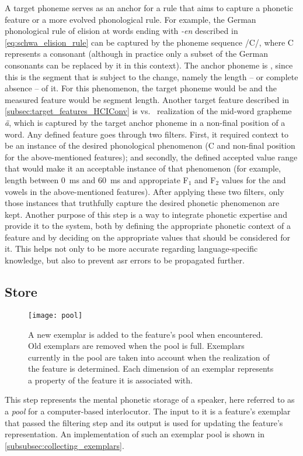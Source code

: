 A target phoneme serves as an anchor for a rule that aims to capture a phonetic feature or a more evolved phonological rule.
For example, the German phonological rule of \textipa{[@]} elision at words ending with \emph{-en} described in \cref{eq:schwa_elision_rule} can be captured by the phoneme sequence /C/, where C represents a consonant (although in practice only a subset of the German consonants can be replaced by it in this context).
The anchor phoneme is \textipa{[@]}, since this is the segment that is subject to the change, namely the length -- or complete absence -- of it.
For this phenomenon, the target phoneme would be  and the measured feature would be segment length.
Another target feature described in \cref{subsec:target_features_HCIConv} is \textipa{[e:]} vs.\ \textipa{[E:]} realization of the mid-word grapheme \emph{ä}, which is captured by the target anchor phoneme \textipa{[E]} in a non-final position of a word.
Any defined feature goes through two filters. First, it required context to be an instance of the desired phonological phenomenon (C and non-final position for the above-mentioned features);
and secondly, the defined accepted value range that would make it an acceptable instance of that phenomenon (for example, \textipa{[@]} length between \SI{0}{\milli\second} and \SI{60}{\milli\second} and appropriate F$_1$ and F$_2$ values for the \textipa{[e:]} and \textipa{[E:]} vowels in the above-mentioned features).
After applying these two filters, only those instances that truthfully capture the desired phonetic phenomenon are kept.
Another purpose of this step is a way to integrate phonetic expertise and provide it to the system, both by defining the appropriate phonetic context of a feature and by deciding on the appropriate values that should be considered for it.
This helps not only to be more accurate regarding language-specific knowledge, but also to prevent \ac{asr} errors to be propagated further.

\subsection{Store}
\label{subsec:store}

\begin{figure}[t]
	\centering
	\texttt{[image: pool]}
	\caption[The exemplar pool]
		{A new exemplar is added to the feature's pool when encountered.
		Old exemplars are removed when the pool is full.
		Exemplars currently in the pool are taken into account when the realization of the feature is determined.
		Each dimension of an exemplar represents a property of the feature it is associated with.}
	\label{fig:exemplar_pool}
\end{figure}
%
This step represents the mental phonetic storage of a speaker, here referred to as a \emph{pool} for a computer-based interlocutor.
The input to it is a feature's exemplar that passed the filtering step and its output is used for updating the feature's representation.
An implementation of such an exemplar pool is shown in \cref{subsubsec:collecting_exemplars}.

